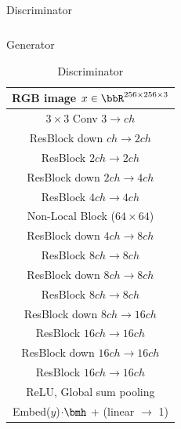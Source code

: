 \begin{table}[ht]
\begin{subtable}{.4\textwidth}
{\begin{tabular}{c}
              \end{tabular}}
              \caption{\label{tab:deep_gen_resnet_imagenet_256} Generator}
          \end{subtable}
          \begin{subtable}{.4\textwidth}
              \centering
              {\begin{tabular}{c}
                  \toprule
                  \midrule
                  RGB image $x\in \bbR^{256 \times 256 \times 3}$ \\
                  \midrule
                  $3\times 3$ Conv $3\rightarrow ch$\\
                  \midrule
                  ResBlock down $ch \rightarrow 2ch$\\
                  \midrule
                  ResBlock $2ch \rightarrow 2ch$\\
                  \midrule
                  ResBlock down $2ch \rightarrow 4ch$\\
                  \midrule
                  ResBlock $4ch \rightarrow 4ch$\\
                  \midrule
                  Non-Local Block ($64\times 64$) \\
                  \midrule
                  ResBlock down $4ch \rightarrow 8ch$\\
                  \midrule
                  ResBlock $8ch \rightarrow 8ch$\\
                  \midrule
                  ResBlock down $8ch \rightarrow 8ch$\\
                  \midrule
                  ResBlock $8ch \rightarrow 8ch$\\
                  \midrule
                  ResBlock down $8ch \rightarrow 16ch$\\
                  \midrule
                  ResBlock $16ch \rightarrow 16ch$\\
                  \midrule
                  ResBlock down $16ch \rightarrow 16ch$\\
                  \midrule
                  ResBlock $16ch \rightarrow 16ch$\\
                  \midrule
                  ReLU, Global sum pooling\\
                  \midrule
                  Embed($y$)$\cdot \bmh$ + (linear $\rightarrow$ 1) \\
                  \midrule
                  \bottomrule
              \end{tabular}}
              \caption{\label{tab:deep_dis_resnet_imagenet_256} Discriminator}
          \end{subtable}
\end{table}

